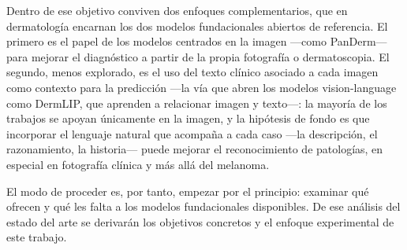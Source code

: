 Dentro de ese objetivo conviven dos enfoques complementarios, que en
dermatología encarnan los dos modelos fundacionales abiertos de
referencia. El primero es el papel de los modelos centrados en la
imagen ---como PanDerm--- para mejorar el diagnóstico a partir de la
propia fotografía o dermatoscopia. El segundo, menos explorado, es el
uso del texto clínico asociado a cada imagen como contexto para la
predicción ---la vía que abren los modelos vision-language como
DermLIP, que aprenden a relacionar imagen y texto---: la mayoría de los
trabajos se apoyan únicamente en la imagen, y la hipótesis de fondo es
que incorporar el lenguaje natural que acompaña a cada caso ---la
descripción, el razonamiento, la historia--- puede mejorar el
reconocimiento de patologías, en especial en fotografía clínica y más
allá del melanoma.

El modo de proceder es, por tanto, empezar por el principio: examinar
qué ofrecen y qué les falta a los modelos fundacionales disponibles.
De ese análisis del estado del arte se derivarán los objetivos
concretos y el enfoque experimental de este trabajo.
